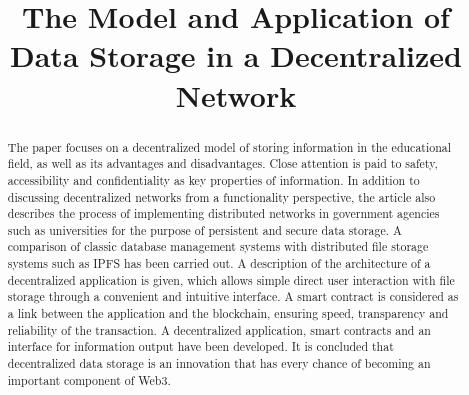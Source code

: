 \documentclass[10pt,conference,a4paper]{IEEEtran_EDM}
\def\confheader{}
\begin{document}
\markboth{\confheader}{}
\title{The Model and Application of Data Storage in a Decentralized Network}

\author{
\and
{}
\and
{}
\and
}

\maketitle


\begin{abstract}
The paper focuses on a decentralized model of storing information in the educational field, as well as its advantages and disadvantages.
Close attention is paid to safety, accessibility and confidentiality as key properties of information.
In addition to discussing decentralized networks from a functionality perspective, the article also describes the process of implementing distributed networks in government agencies such as universities for the purpose of persistent and secure data storage.
A comparison of classic database management systems with distributed file storage systems such as IPFS has been carried out.
A description of the architecture of a decentralized application is given, which allows simple direct user interaction with file storage through a convenient and intuitive interface.
A smart contract is considered as a link between the application and the blockchain, ensuring speed, transparency and reliability of the transaction.
A decentralized application, smart contracts and an interface for information output have been developed.
It is concluded that decentralized data storage is an innovation that has every chance of becoming an important component of Web3.

\end{abstract}
\end{document}

